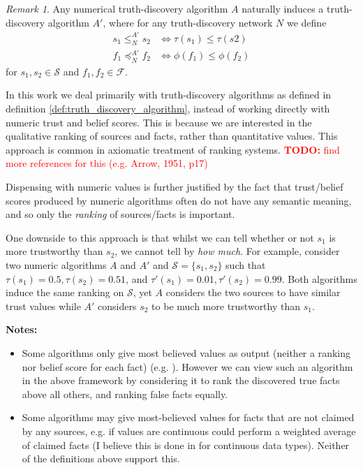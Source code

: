 \documentclass{article}
\theoremstyle{definition}
\theoremstyle{plain}
\theoremstyle{remark}
\newtheorem{remark}{Remark}
\newcommand{\todo}[1] {
    \textcolor{red}{
        \textbf{TODO:} #1
    }
}
\begin{document}
\begin{remark}
    Any numerical truth-discovery algorithm $A$ naturally induces a truth-discovery
    algorithm $A'$, where for any truth-discovery network $N$ we define
    \begin{align*}
    s_1 \le_N^{A'} s_2 & \iff \tau(s_1) \le \tau(s2) \\
    f_1 \preceq_N^{A'} f_2 & \iff \phi(f_1) \le \phi(f_2)
    \end{align*}
    for $s_1, s_2 \in \mathcal{S}$ and $f_1, f_2 \in \mathcal{F}$.

    In this work we deal primarily with truth-discovery algorithms as defined
    in definition \ref{def:truth_discovery_algorithm}, instead of working
    directly with numeric trust and belief scores. This is because we are
    interested in the qualitative ranking of sources and facts, rather than
    quantitative values. This approach is common in axiomatic treatment of
    ranking systems{\cite{altman,altman_personalised}}. \todo{find more
    references for this (e.g. Arrow, 1951, p17)}

    Dispensing with numeric values is further justified by the fact that
    trust/belief scores produced by numeric algorithms often do not have any
    semantic meaning\cite{pasternack}, and so only the \emph{ranking} of
    sources/facts is important.

    One downside to this approach is that whilst we can tell whether or not
    $s_1$ is more trustworthy than $s_2$, we cannot tell by \emph{how much}.
    For example, consider two numeric algorithms $A$ and $A'$ and
    $\mathcal{S}=\{s_1, s_2\}$ such that $\tau(s_1)=0.5, \tau(s_2)=0.51$, and
    $\tau'(s_1)=0.01, \tau'(s_2)=0.99$. Both algorithms induce the same ranking
    on $\mathcal{S}$, yet $A$ considers the two sources to have similar trust
    values while $A'$ considers $s_2$ to be much more trustworthy than $s_1$.

\end{remark}

\textbf{Notes:}
\begin{itemize}

\item Some algorithms only give most believed values as output (neither a
ranking nor belief score for each fact) (e.g. \cite{li_conflicts}). However we
can view such an algorithm in the above framework by considering it to rank the
discovered true facts above all others, and ranking false facts equally.

\item Some algorithms may give most-believed values for facts that are not
claimed by any sources, e.g. if values are continuous could perform a weighted
average of claimed facts (I believe this is done in \cite{li_conflicts} for
continuous data types). Neither of the definitions above support this.

\end{itemize}
\end{document}
